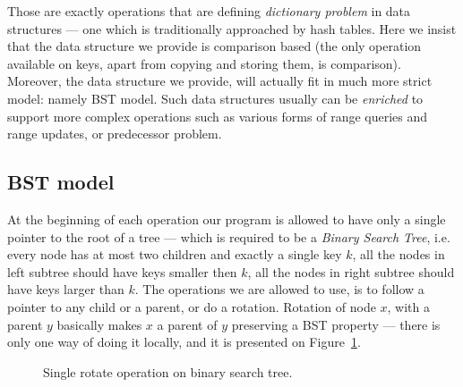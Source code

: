 \documentclass[11pt]{article}
\begin{document}
Those are exactly operations that are defining {\it dictionary problem} in data structures --- one which is traditionally approached by hash tables. Here we insist that the data structure we provide is comparison based (the only operation available on keys, apart from copying and storing them, is comparison). Moreover, the data structure we provide, will actually fit in much more strict model: namely BST model. Such data structures usually can be {\it enriched} to support more complex operations such as various forms of range queries and range updates, or predecessor problem.
\subsection{BST model}
At the beginning of each operation our program is allowed to have only a single pointer to the root of a tree --- which is required to be a {\it Binary Search Tree}, i.e. every node has at most two children and exactly a single key $k$, all the nodes in left subtree should have keys smaller then $k$, all the nodes in right subtree should have keys larger than $k$. The operations we are allowed to use, is to follow a pointer to any child or a parent, or do a rotation. Rotation of node $x$, with a parent $y$ basically makes $x$ a parent of $y$ preserving a BST property --- there is only one way of doing it locally, and it is presented on Figure~\ref{rotate}.
\begin{figure}
\begin{center}
\end{center}
\caption{\label{rotate}Single rotate operation on binary search tree.}
\end{figure}
\end{document}
